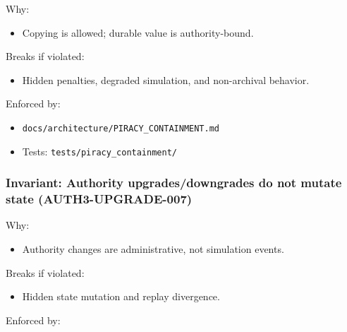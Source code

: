 \documentclass[9pt,a4paper,openany]{book}
\begin{document}
Why:



\begin{itemize}
\item Copying is allowed; durable value is authority-\allowbreak{}bound.\allowbreak{}
\end{itemize}


Breaks if violated:



\begin{itemize}
\item Hidden penalties, degraded simulation, and non-\allowbreak{}archival behavior.\allowbreak{}
\end{itemize}


Enforced by:



\begin{itemize}
\item \texttt{docs/\allowbreak{}architecture/\allowbreak{}PIRACY\_\allowbreak{}CONTAINMENT.\allowbreak{}md}
\end{itemize}


\begin{itemize}
\item Tests: \texttt{tests/\allowbreak{}piracy\_\allowbreak{}containment/\allowbreak{}}
\end{itemize}





\subsubsection{Invariant: Authority upgrades/downgrades do not mutate state (AUTH3-UPGRADE-007)}


Why:



\begin{itemize}
\item Authority changes are administrative, not simulation events.\allowbreak{}
\end{itemize}


Breaks if violated:



\begin{itemize}
\item Hidden state mutation and replay divergence.\allowbreak{}
\end{itemize}


Enforced by:
\end{document}
